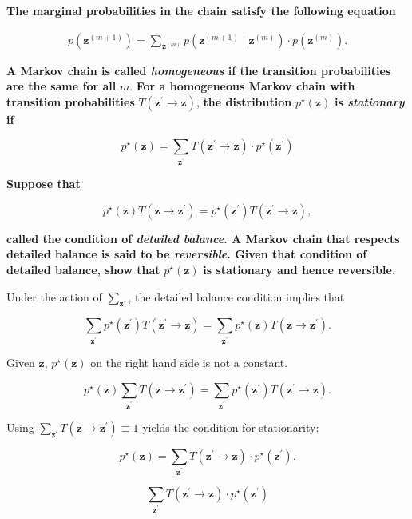 \documentclass[11pt]{article}
\begin{document}
\textbf{The marginal probabilities in the chain satisfy the following equation}

\begin{align*}
p(\mathbf{z}^{(m+1)})=\sum_{\mathbf{z}^{(m)}} p(\mathbf{z}^{(m+1)} \mid \mathbf{z}^{(m)}) \cdot p(\mathbf{z}^{(m)}).
\end{align*}

\textbf{A Markov chain is called \emph{homogeneous} if the transition probabilities are the same for all} \(m\). \textbf{For a homogeneous Markov chain with transition probabilities} \(T\left(\mathbf{z}^{\prime} \to \mathbf{z}\right)\), \textbf{the distribution} \(p^{\star}(\mathbf{z})\) \textbf{is \emph{stationary} if}

\[
p^{\star}(\mathbf{z})=\sum_{\mathbf{z}^{\prime}} T(\mathbf{z}^{\prime} \to \mathbf{z}) \cdot p^{\star}(\mathbf{z}^{\prime})
\]

\textbf{Suppose that}

\[
p^{\star}(\mathbf{z}) T(\mathbf{z} \to \mathbf{z}^{\prime})=p^{\star}(\mathbf{z}^{\prime}) T(\mathbf{z}^{\prime} \to \mathbf{z}),
\]

\textbf{called the condition of \emph{detailed balance}. A Markov chain that respects detailed balance is said to be \emph{reversible}. Given that condition of detailed balance, show that} \(p^{\star} (\mathbf{z})\) \textbf{is stationary and hence reversible.}

Under the action of \(\sum_{\mathbf{z}^{\prime}}\), the detailed balance condition implies that

\[
\sum_{\mathbf{z}^{\prime}} p^{\star}(\mathbf{z}^{\prime}) T(\mathbf{z}^{\prime} \to \mathbf{z}) = \sum_{\mathbf{z}^{\prime}} p^{\star}(\mathbf{z}) T(\mathbf{z} \to \mathbf{z}^{\prime}).
\]

Given \(\mathbf{z}\), \(p^{\star} (\mathbf{z})\) on the right hand side is not a constant.

\[
p^{\star}(\mathbf{z}) \sum_{\mathbf{z}^{\prime}} T(\mathbf{z} \to \mathbf{z}^{\prime}) = \sum_{\mathbf{z}^{\prime}} p^{\star}(\mathbf{z}^{\prime}) T(\mathbf{z}^{\prime} \to \mathbf{z}).
\]

Using \(\sum_{\mathbf{z}^{\prime}} T(\mathbf{z} \to \mathbf{z}^{\prime}) \equiv 1\) yields the condition for stationarity:

\[
p^{\star}(\mathbf{z})=\sum_{\mathbf{z}^{\prime}} T(\mathbf{z}^{\prime} \to \mathbf{z}) \cdot p^{\star}(\mathbf{z}^{\prime}).
\]


\[
\sum_{\mathbf{z}^{\prime}} T(\mathbf{z}^{\prime} \to \mathbf{z}) \cdot p^{\star}(\mathbf{z}^{\prime})
\]
\end{document}
